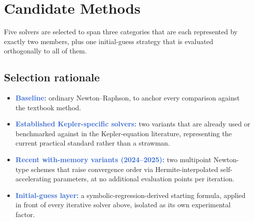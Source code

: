 \documentclass[11pt,a4paper]{article}
\newcommand{\key}[1]{\textcolor{Highlight}{\bfseries #1}}
\begin{document}
\section{Candidate Methods}

Five solvers are selected to span three categories that are each
represented by exactly two members, plus one initial-guess strategy that
is evaluated orthogonally to all of them.

\subsection{Selection rationale}
\begin{itemize}
  \item \key{Baseline:} ordinary Newton--Raphson, to anchor every
        comparison against the textbook method.
  \item \key{Established Kepler-specific solvers:} two variants that are
        already used or benchmarked against in the Kepler-equation
        literature, representing the current practical standard rather
        than a strawman.
  \item \key{Recent with-memory variants (2024--2025):} two multipoint
        Newton-type schemes that raise convergence order via
        Hermite-interpolated self-accelerating parameters, at no
        additional evaluation points per iteration.
  \item \key{Initial-guess layer:} a symbolic-regression-derived starting
        formula, applied in front of every iterative solver above,
        isolated as its own experimental factor.
\end{itemize}
\end{document}
